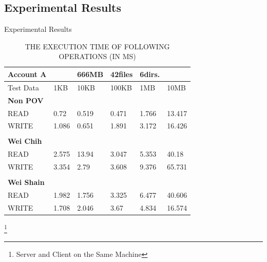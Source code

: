 \documentclass{beamer}
\begin{document}
\begin{CJK}{UTF8}{bkai}
\section{Experimental Results}
\begin{frame}{Experimental Results}
	\begin{table}[]
	\centering
	\captionsetup{justification=centering}
	\caption{\tiny THE EXECUTION TIME OF FOLLOWING OPERATIONS (IN MS)}
	\begin{tabular}{|l|l|l|l|l|l|}
	\hline
	Account A          &       & 666MB & 42files & 6dirs. &        \\ \hline
	Test Data          & 1KB   & 10KB  & 100KB   & 1MB    & 10MB   \\ \hline
	\textbf{Non POV}   &       &       &         &        &        \\ \hline
	READ               & 0.72  & 0.519 & 0.471   & 1.766  & 13.417 \\ \hline
	WRITE              & 1.086 & 0.651 & 1.891   & 3.172  & 16.426 \\ \hline
	                   &       &       &         &        &        \\ \hline
	\textbf{Wei Chih}  &       &       &         &        &        \\ \hline
	READ               & 2.575 & 13.94 & 3.047   & 5.353  & 40.18  \\ \hline
	WRITE              & 3.354 & 2.79  & 3.608   & 9.376  & 65.731 \\ \hline
	                   &       &       &         &        &        \\ \hline
	\textbf{Wei Shain} &       &       &         &        &        \\ \hline
	READ               & 1.982 & 1.756 & 3.325   & 6.477  & \alert{40.606} \\ \hline
	WRITE              & 1.708 & 2.046 & 3.67    & 4.834  & \alert{16.574} \\ \hline
	\end{tabular}
	\end{table}
	\footnote{Server and Client on the Same Machine}
\end{frame}


\end{CJK}
\end{document}
